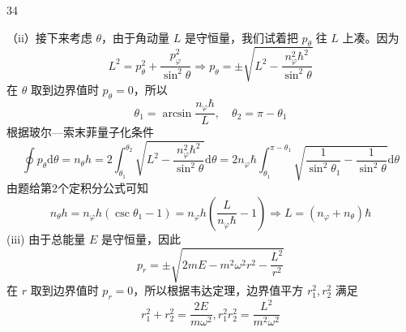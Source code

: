 \begin{solution}{34}
\begin{subsolution}
\begin{subsubsolution}
\begin{equation}
                \label{eq:14.s34}
            \end{equation}
            （ii）接下来考虑 $\theta$，由于角动量 $L$ 是守恒量，我们试着把 $p_{\theta}$ 往 $L$ 上凑。因为
            \begin{equation}
                L ^ {2} = p _ {\theta} ^ {2} + \frac {p _ {\varphi} ^ {2}}{\sin^ {2} \theta} \Rightarrow p _ {\theta} = \pm \sqrt {L ^ {2} - \frac {n _ {\varphi} ^ {2} \hbar^ {2}}{\sin^ {2} \theta}}
                \label{eq:15.s34}
            \end{equation}
            在 $\theta$ 取到边界值时 $p_{\theta} = 0$，所以
            \begin{equation}
                \theta_ {1} = \arcsin {\frac {n _ {\varphi} \hbar}{L}}, \quad \theta_ {2} = \pi - \theta_ {1}
                \label{eq:16.s34}
            \end{equation}
            根据玻尔—索末菲量子化条件
            \begin{equation}
                \oint p _ {\theta} \mathrm{d} \theta = n _ {\theta} h = 2 \int_ {\theta_ {1}} ^ {\theta_ {2}} \sqrt {L ^ {2} - \frac {n _ {\varphi} ^ {2} \hbar^ {2}}{\sin^ {2} \theta}} \mathrm{d} \theta = 2 n _ {\varphi} \hbar \int_ {\theta_ {1}} ^ {\pi - \theta_ {1}} \sqrt {\frac {1}{\sin^ {2} \theta_ {1}} - \frac {1}{\sin^ {2} \theta}} \mathrm{d} \theta
                \label{eq:17.s34}
            \end{equation}
            由题给第2个定积分公式可知
            \begin{equation}
                n _ {\theta} h = n _ {\varphi} h \left(\csc \theta_ {1} - 1\right) = n _ {\varphi} h \left(\frac {L}{n _ {\varphi} \hbar} - 1\right) \Rightarrow L = \left(n _ {\varphi} + n _ {\theta}\right) \hbar
                \label{eq:18.s34}
            \end{equation}
            (iii) 由于总能量 $E$ 是守恒量，因此
            \begin{equation}
                p _ {r} = \pm \sqrt {2 m E - m ^ {2} \omega^ {2} r ^ {2} - \frac {L ^ {2}}{r ^ {2}}}
                \label{eq:19.s34}
            \end{equation}
            在 $r$ 取到边界值时 $p_r = 0$，所以根据韦达定理，边界值平方 $r_1^2, r_2^2$ 满足
            \begin{equation}
                r _ {1} ^ {2} + r _ {2} ^ {2} = \frac {2 E}{m \omega^ {2}}, r _ {1} ^ {2} r _ {2} ^ {2} = \frac {L ^ {2}}{m ^ {2} \omega^ {2}}
                \label{eq:20.s34}
            \end{equation}

\end{subsubsolution}
\end{subsolution}
\end{solution}
